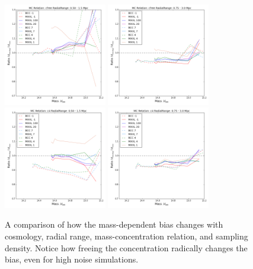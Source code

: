 \documentclass[11pt]{article}
\begin{document}
\begin{figure} \centering
\includegraphics[width=0.4\textwidth]{figures/density_cfree-r5}
\includegraphics[width=0.4\textwidth]{figures/density_cfree-r10}\\
\includegraphics[width=0.4\textwidth]{figures/density_c4-r5}
\includegraphics[width=0.4\textwidth]{figures/density_c4-r10}
\caption{A comparison of how the mass-dependent bias changes with cosmology, radial range, mass-concentration relation, and sampling density. Notice how freeing the concentration radically changes the bias, even for high noise simulations.}
\end{figure}
\end{document}
